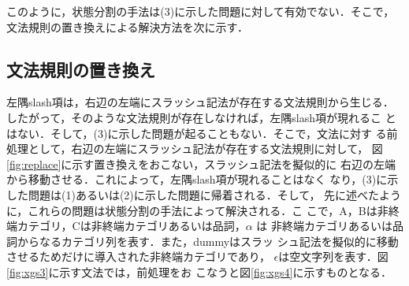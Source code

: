 このように，状態分割の手法は(3)に示した問題に対して有効でない．そこで，
文法規則の置き換えによる解決方法を次に示す．

\subsection{文法規則の置き換え}

左隅slash項は，右辺の左端にスラッシュ記法が存在する文法規則から生じる．
したがって，そのような文法規則が存在しなければ，左隅slash項が現れるこ
とはない．そして，(3)に示した問題が起ることもない．そこで，文法に対す
る前処理として，右辺の左端にスラッシュ記法が存在する文法規則に対して，
図\ref{fig:replace}に示す置き換えをおこない，スラッシュ記法を擬似的に
右辺の左端から移動させる．これによって，左隅slash項が現れることはなく
なり，(3)に示した問題は(1)あるいは(2)に示した問題に帰着される．そして，
先に述べたように，これらの問題は状態分割の手法によって解決される．こ
こで，A，Bは非終端カテゴリ，Cは非終端カテゴリあるいは品詞，$\alpha$ は
非終端カテゴリあるいは品詞からなるカテゴリ列を表す．また，dummyはスラッ
シュ記法を擬似的に移動させるためだけに導入された非終端カテゴリであり，
$\epsilon$は空文字列を表す．図\ref{fig:xgs3}に示す文法では，前処理をお
こなうと図\ref{fig:xgs4}に示すものとなる．

